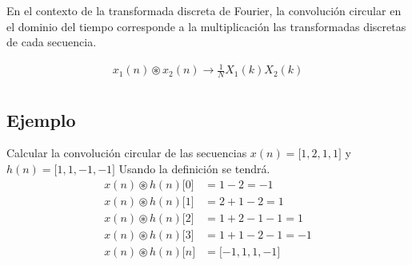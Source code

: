 \documentclass[12pt]{article}
\begin{document}
En el contexto de la transformada discreta de Fourier, la convolución circular en el dominio del tiempo corresponde a la multiplicación las transformadas discretas de cada secuencia.

\begin{equation}
    \begin{split}
        x_1(n)\circledast x_2(n)\to \frac{1}{N}X_1(k)X_2(k)\\    
    \end{split}
    \label{eq:circular}
\end{equation}
\subsection{Ejemplo}
Calcular la convolución circular de las secuencias $x(n)=\lbrack 1,2,1,1\rbrack$ y $h(n)=\lbrack 1,1,-1,-1\rbrack$
Usando la definición se tendrá.
\begin{equation}
    \begin{split}
        x(n)\circledast h(n)\lbrack0\rbrack&=1-2=-1\\
        x(n)\circledast h(n)\lbrack1\rbrack&=2+1-2=1\\
        x(n)\circledast h(n)\lbrack2\rbrack&=1+2-1-1=1\\
        x(n)\circledast h(n)\lbrack3\rbrack&=1+1-2-1=-1\\
        x(n)\circledast h(n)\lbrack n\rbrack&=\lbrack-1,1,1,-1 \rbrack\\
    \end{split}
    \label{eq:example_dft}
\end{equation}


\end{document}
